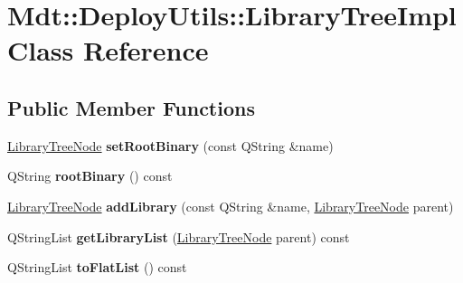 \hypertarget{class_mdt_1_1_deploy_utils_1_1_library_tree_impl}{}\section{Mdt\+:\+:Deploy\+Utils\+:\+:Library\+Tree\+Impl Class Reference}
\label{class_mdt_1_1_deploy_utils_1_1_library_tree_impl}
\subsection*{Public Member Functions}
\begin{DoxyCompactItemize}
\item 
\hyperlink{class_mdt_1_1_deploy_utils_1_1_library_tree_node}{Library\+Tree\+Node} {\bfseries set\+Root\+Binary} (const Q\+String \&name)\hypertarget{class_mdt_1_1_deploy_utils_1_1_library_tree_impl_a9884fe30a669f1dee425bf3673f355fe}{}\label{class_mdt_1_1_deploy_utils_1_1_library_tree_impl_a9884fe30a669f1dee425bf3673f355fe}

\item 
Q\+String {\bfseries root\+Binary} () const \hypertarget{class_mdt_1_1_deploy_utils_1_1_library_tree_impl_af129a3d1a6f6fd5d9b61a7bb797047bf}{}\label{class_mdt_1_1_deploy_utils_1_1_library_tree_impl_af129a3d1a6f6fd5d9b61a7bb797047bf}

\item 
\hyperlink{class_mdt_1_1_deploy_utils_1_1_library_tree_node}{Library\+Tree\+Node} {\bfseries add\+Library} (const Q\+String \&name, \hyperlink{class_mdt_1_1_deploy_utils_1_1_library_tree_node}{Library\+Tree\+Node} parent)\hypertarget{class_mdt_1_1_deploy_utils_1_1_library_tree_impl_aa784069e6cf38ab4ff6e5f9a716b12fd}{}\label{class_mdt_1_1_deploy_utils_1_1_library_tree_impl_aa784069e6cf38ab4ff6e5f9a716b12fd}

\item 
Q\+String\+List {\bfseries get\+Library\+List} (\hyperlink{class_mdt_1_1_deploy_utils_1_1_library_tree_node}{Library\+Tree\+Node} parent) const \hypertarget{class_mdt_1_1_deploy_utils_1_1_library_tree_impl_a5fba210f4ade21d32ee511befa86c501}{}\label{class_mdt_1_1_deploy_utils_1_1_library_tree_impl_a5fba210f4ade21d32ee511befa86c501}

\item 
Q\+String\+List {\bfseries to\+Flat\+List} () const \hypertarget{class_mdt_1_1_deploy_utils_1_1_library_tree_impl_a12b1e182e231779aac5096befdfb8672}{}\label{class_mdt_1_1_deploy_utils_1_1_library_tree_impl_a12b1e182e231779aac5096befdfb8672}


\end{DoxyCompactItemize}
